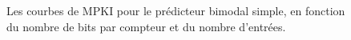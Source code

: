 \documentclass[a4paper]{article}
\begin{document}
\begin{figure}[h]
{      \label{plot5}
      }
      \caption{\label{results}Les courbes de MPKI pour le prédicteur bimodal simple, en fonction du nombre de bits par compteur et du nombre d'entrées.}
      \end{figure}
\end{document}
